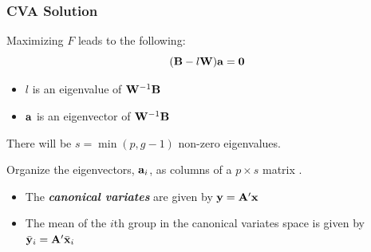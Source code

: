 \documentclass{beamer}
\begin{document}
\begin{frame}
  \frametitle{CVA Solution}

Maximizing $F$ leads to the following:
\[
(\mathbf{B} - l\mathbf{W})\mathbf{a} = \mathbf{0}
\]

\begin{itemize}
\item $l$ is an eigenvalue of $\mathbf{W}^{-1}\mathbf{B}$
\item $\mathbf{a}$ is an eigenvector of $\mathbf{W}^{-1}\mathbf{B}$
\end{itemize}

There will be $s=\min(p, g-1)$ non-zero eigenvalues.
\medskip

Organize the eigenvectors, $\mathbf{a}_i$, as columns of a $p \times s $ matrix . 
\begin{itemize}
\item The \textbf{\emph{canonical variates}} are given by $\mathbf{y} = \mathbf{A}'\mathbf{x}$
\item The mean of the $i$th group in the canonical variates space is given by $\bar{\mathbf{y}}_i = \mathbf{A}'\bar{\mathbf{x}}_i$
\end{itemize}

\end{frame}
\end{document}
